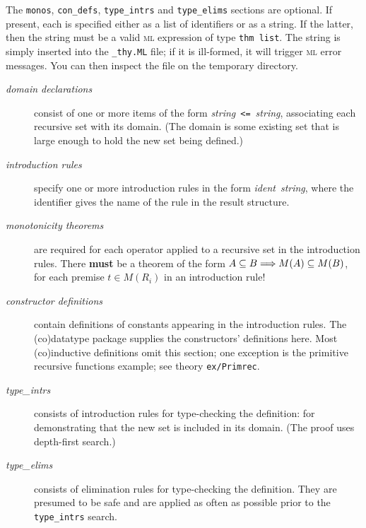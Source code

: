 The {\tt monos}, {\tt con\_defs}, {\tt type\_intrs} and {\tt type\_elims}
sections are optional.  If present, each is specified either as a list of
identifiers or as a string.  If the latter, then the string must be a valid
\textsc{ml} expression of type {\tt thm list}.  The string is simply inserted
into the {\tt _thy.ML} file; if it is ill-formed, it will trigger \textsc{ml}
error messages.  You can then inspect the file on the temporary directory.

\begin{description}
\item[\it domain declarations] consist of one or more items of the form
  {\it string\/}~{\tt <=}~{\it string}, associating each recursive set with
  its domain.  (The domain is some existing set that is large enough to
  hold the new set being defined.)

\item[\it introduction rules] specify one or more introduction rules in
  the form {\it ident\/}~{\it string}, where the identifier gives the name of
  the rule in the result structure.

\item[\it monotonicity theorems] are required for each operator applied to
  a recursive set in the introduction rules.  There \textbf{must} be a theorem
  of the form $A\subseteq B\Longrightarrow M(A)\subseteq M(B)$, for each premise $t\in M(R_i)$
  in an introduction rule!

\item[\it constructor definitions] contain definitions of constants
  appearing in the introduction rules.  The (co)datatype package supplies
  the constructors' definitions here.  Most (co)inductive definitions omit
  this section; one exception is the primitive recursive functions example;
  see theory \texttt{ex/Primrec}.
  
\item[\it type\_intrs] consists of introduction rules for type-checking the
  definition: for demonstrating that the new set is included in its domain.
  (The proof uses depth-first search.)

\item[\it type\_elims] consists of elimination rules for type-checking the
  definition.  They are presumed to be safe and are applied as often as
  possible prior to the {\tt type\_intrs} search.
\end{description}

